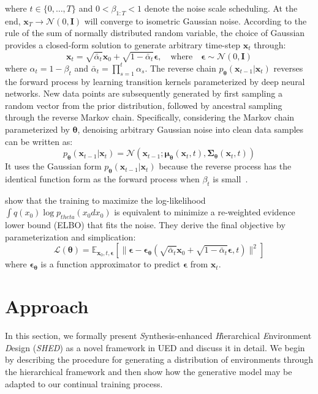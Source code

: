 \documentclass{article}
\newcommand\vx{\bm{x}}
\newcommand\mI{\bm{I}}
\newcommand\vmu{\bm{\mu}}
\newcommand\mSigma{\bm{\Sigma}}
\begin{document}
where $t\in\{ 0,\dots, T\}$ and $0<\beta_{1:T}<1$ denote the noise scale scheduling. At the end, $\vx_T \rightarrow \mathcal{N} (0,\mI)$ will converge to isometric Gaussian noise. According to the rule of the sum of normally distributed random variable, the choice of Gaussian provides a closed-form solution to generate arbitrary time-step $\vx_t$ through:
\begin{equation*}
    \vx_t = \sqrt{\bar{\alpha}_t}\vx_0 + \sqrt{1-\bar{\alpha}_t }\bm{\epsilon}, \quad \text{where} \quad \bm{\epsilon}\sim \mathcal{N} (0,\mI)
\end{equation*}
where $\alpha_t = 1- \beta_t$ and $\bar{\alpha}_t = \prod_{s=1}^t \alpha_s$. 
 The reverse chain $p_{\bm{\theta}}(\vx_{t-1}|\vx_t)$ reverses the forward process by learning transition kernels parameterized by deep neural networks. New data points are subsequently generated by first sampling a random vector from the prior distribution, followed by ancestral sampling through the reverse Markov chain. Specifically, considering the Markov chain parameterized by $\bm{\theta}$, denoising arbitrary Gaussian noise into clean data samples can be written as:
\begin{equation*}
    p_{\bm{\theta}}(\vx_{t-1}|\vx_t) =  \mathcal{N} ( \vx_{t-1} ; \vmu_{\bm{\theta}}(\vx_t,t) , \mSigma_{\bm{\theta}}(\vx_t,t))
\end{equation*}
It uses the Gaussian form $ p_{\bm{\theta}}(\vx_{t-1}|\vx_t)$ because the reverse process has the identical function form as the forward process when $\beta_t$ is small~\citep{sohl2015deep}.

\citet{ho2020denoising} show that the training to maximize the log-likelihood $\int q(x_0) \log p_{theta}(x_{0} d x_{0})$ is equivalent to minimize a re-weighted evidence lower bound (ELBO) that fits the noise. They derive the final objective by parameterization and simplication:
\begin{equation*}
    \mathcal{L}(\bm{\theta}) = \mathbb{E}_{\vx_0,t,\bm{\epsilon}} \left[ \lVert \bm{\epsilon}  - \bm{\epsilon}_{\bm{\theta}}(\sqrt{\bar{\alpha}_t}\vx_0 + \sqrt{1-\bar{\alpha}_t }\bm{\epsilon},t)  \rVert^2  \right]
\end{equation*}
where $\bm{\epsilon}_{\bm{\theta}}$ is a function approximator to predict $\bm{\epsilon}$ from $\vx_t$.



\section{Approach}
In this section, we formally present \emph{S}ynthesis-enhanced \emph{H}ierarchical \emph{E}nvironment \emph{D}esign ({\em SHED}) as a novel framework in UED and discuss it in detail.
We begin by describing the procedure for generating a distribution of environments through the hierarchical framework and then show how the generative model may be adapted to our continual training process.
\end{document}
